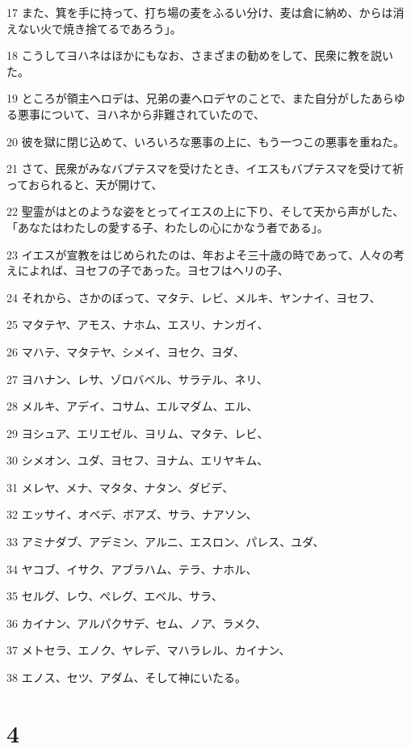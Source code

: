 \par 17 また、箕を手に持って、打ち場の麦をふるい分け、麦は倉に納め、からは消えない火で焼き捨てるであろう」。
\par 18 こうしてヨハネはほかにもなお、さまざまの勧めをして、民衆に教を説いた。
\par 19 ところが領主ヘロデは、兄弟の妻ヘロデヤのことで、また自分がしたあらゆる悪事について、ヨハネから非難されていたので、
\par 20 彼を獄に閉じ込めて、いろいろな悪事の上に、もう一つこの悪事を重ねた。
\par 21 さて、民衆がみなバプテスマを受けたとき、イエスもバプテスマを受けて祈っておられると、天が開けて、
\par 22 聖霊がはとのような姿をとってイエスの上に下り、そして天から声がした、「あなたはわたしの愛する子、わたしの心にかなう者である」。
\par 23 イエスが宣教をはじめられたのは、年およそ三十歳の時であって、人々の考えによれば、ヨセフの子であった。ヨセフはヘリの子、
\par 24 それから、さかのぼって、マタテ、レビ、メルキ、ヤンナイ、ヨセフ、
\par 25 マタテヤ、アモス、ナホム、エスリ、ナンガイ、
\par 26 マハテ、マタテヤ、シメイ、ヨセク、ヨダ、
\par 27 ヨハナン、レサ、ゾロバベル、サラテル、ネリ、
\par 28 メルキ、アデイ、コサム、エルマダム、エル、
\par 29 ヨシュア、エリエゼル、ヨリム、マタテ、レビ、
\par 30 シメオン、ユダ、ヨセフ、ヨナム、エリヤキム、
\par 31 メレヤ、メナ、マタタ、ナタン、ダビデ、
\par 32 エッサイ、オベデ、ボアズ、サラ、ナアソン、
\par 33 アミナダブ、アデミン、アルニ、エスロン、パレス、ユダ、
\par 34 ヤコブ、イサク、アブラハム、テラ、ナホル、
\par 35 セルグ、レウ、ペレグ、エベル、サラ、
\par 36 カイナン、アルパクサデ、セム、ノア、ラメク、
\par 37 メトセラ、エノク、ヤレデ、マハラレル、カイナン、
\par 38 エノス、セツ、アダム、そして神にいたる。

\chapter{4}

